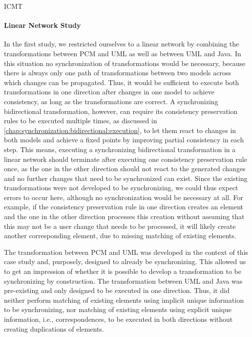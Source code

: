 \begin{copiedFrom}{ICMT}
\paragraph{Linear Network Study} 
In the first study, we restricted ourselves to a linear network by combining the transformations between \gls{PCM} and \gls{UML} as well as between \gls{UML} and Java.
In this situation no synchronization of transformations would be necessary, because there is always only one path of transformations between two models across which changes can be propagated.
Thus, it would be sufficient to execute both transformations in one direction after changes in one model to achieve consistency, as long as the transformations are correct.
A synchronizing bidirectional transformation, however, can require its consistency preservation rules to be executed multiple times, as discussed in \autoref{chap:synchronization:bidirectional:execution}, to let them react to changes in both models and achieve a fixed points by improving partial consistency in each step.
This means, executing a synchronizing bidirectional transformation in a linear network should terminate after executing one consistency preservation rule once, as the one in the other direction should not react to the generated changes and no further changes that need to be synchronized can exist.
Since the existing transformations were not developed to be synchronizing, we could thus expect errors to occur here, although no synchronization would be necessary at all.
For example, if the consistency preservation rule in one direction creates an element and the one in the other direction processes this creation without assuming that this may not be a user change that needs to be processed, it will likely create another corresponding element, due to missing matching of existing elements.

The transformation between \gls{PCM} and \gls{UML} was developed in the context of this case study and, purposely, designed to already be synchronizing.
This allowed us to get an impression of whether it is possible to develop a transformation to be synchronizing by construction.
The transformation between \gls{UML} and Java was pre-existing and only designed to be executed in one direction.
Thus, it did neither perform matching of existing elements using implicit unique information to be synchronizing, nor matching of existing elements using explicit unique information, i.e., correspondences, to be executed in both directions without creating duplications of elements.


\end{copiedFrom}
